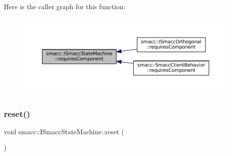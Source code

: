 Here is the caller graph for this function\+:
\nopagebreak
\begin{figure}[H]
\begin{center}
\leavevmode
\includegraphics[width=350pt]{classsmacc_1_1ISmaccStateMachine_aa6b25e28f3bce24c4b356dc865a9eb7b_icgraph}
\end{center}
\end{figure}
\mbox{\label{classsmacc_1_1ISmaccStateMachine_a9e4b4fe4dda962642397993235c6eea0}} 
\subsubsection{\texorpdfstring{reset()}{reset()}}
{\footnotesize\ttfamily void smacc\+::\+I\+Smacc\+State\+Machine\+::reset (\begin{DoxyParamCaption}{ }\end{DoxyParamCaption})\hspace{0.3cm}{\ttfamily [virtual]}}




